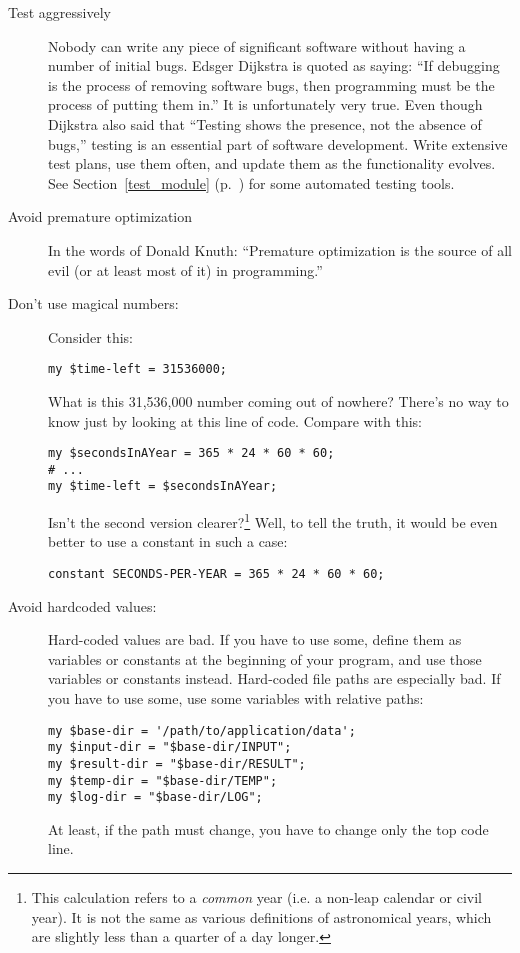 \begin{description}
\item[Test aggressively] Nobody can write any piece of 
significant software without having a number of initial 
bugs. Edsger Dijkstra is quoted as saying: ``If 
debugging is the process of removing software bugs,
then programming must be the process of putting them in.'' 
It is unfortunately very true. Even though Dijkstra 
also said that ``Testing shows the presence, not the absence 
of bugs,'' testing is an essential part of software 
development. Write extensive test plans, use them often, and 
update them as the functionality evolves. See Section~\ref{test_module} 
(p.~\pageref{test_module}) for some automated testing tools.

\item[Avoid premature optimization] In the words of Donald 
Knuth: ``Premature optimization is the source of all evil (or 
at least most of it) in programming.''

\item[Don't use magical numbers:] Consider this:
\begin{verbatim}
my $time-left = 31536000;
\end{verbatim}

What is this 31,536,000 number coming out of nowhere? 
There's no way to know just by looking at this line 
of code. Compare with this:

\begin{verbatim}
my $secondsInAYear = 365 * 24 * 60 * 60;
# ...
my $time-left = $secondsInAYear;
\end{verbatim}

Isn't the second version clearer?\footnote{This calculation refers to a \emph{common} year (i.e. a non-leap calendar or civil year). It is not 
the same as various definitions of astronomical years, which are slightly less 
than a quarter of a day longer.} Well, to tell the 
truth, it would be even better to use a constant in 
such a case:
\begin{verbatim}
constant SECONDS-PER-YEAR = 365 * 24 * 60 * 60;
\end{verbatim}

\item[Avoid hardcoded values:] Hard-coded values are bad.
If you have to use some, define them as variables or constants 
at the beginning of your program, and use those variables or 
constants instead. Hard-coded file paths are especially bad. If you 
have to use some, use some variables with relative paths:
\begin{verbatim}
my $base-dir = '/path/to/application/data';
my $input-dir = "$base-dir/INPUT";
my $result-dir = "$base-dir/RESULT";
my $temp-dir = "$base-dir/TEMP";
my $log-dir = "$base-dir/LOG";
\end{verbatim}
At least, if the path must change, you have to change only 
the top code line.


\end{description}
